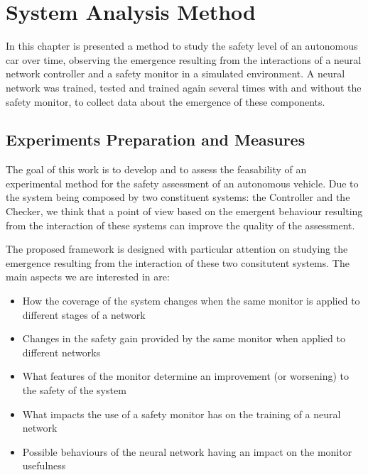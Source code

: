 \chapter{System Analysis Method}

In this chapter is presented a method to study the safety level of an autonomous car over time, observing the emergence resulting from the interactions of a neural network controller and a safety monitor in a simulated environment.\newline
A neural network was trained, tested and trained again several times with and without the safety monitor, to collect data about the emergence of these components.

\section{Experiments Preparation and Measures}

The goal of this work is to develop and to assess the feasability of an experimental method for the safety assessment of an autonomous vehicle. Due to the system being composed by two constituent systems: the Controller and the Checker, we think that a point of view based on the emergent behaviour resulting from the interaction of these systems can improve the quality of the assessment.\newline

The proposed framework is designed with particular attention on studying the emergence resulting from the interaction of these two consitutent systems. The main aspects we are interested in are:

\begin{itemize}
	\item How the coverage of the system changes when the same monitor is applied to different stages of a network
	\item Changes in the safety gain provided by the same monitor when applied to different networks
	\item What features of the monitor determine an improvement (or worsening) to the safety of the system
	\item What impacts the use of a safety monitor has on the training of a neural network
	\item Possible behaviours of the neural network having an impact on the monitor usefulness
\end{itemize}

